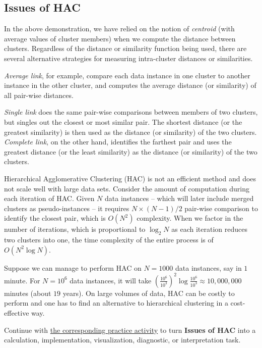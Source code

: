 \documentclass[
  letterpaper,
]{scrbook}
\begin{document}
\subsection{Issues of HAC}\label{issues-of-hac}

In the above demonstration, we have relied on the notion of
\emph{centroid} (with average values of cluster members) when we compute
the distance between clusters. Regardless of the distance or similarity
function being used, there are several alternative strategies for
measuring intra-cluster distances or similarities.

\emph{Average link}, for example, compare each data instance in one
cluster to another instance in the other cluster, and computes the
average distance (or similarity) of all pair-wise distances.

\emph{Single link} does the same pair-wise comparisons between members
of two clusters, but singles out the closest or most similar pair. The
shortest distance (or the greatest similarity) is then used as the
distance (or similarity) of the two clusters. \emph{Complete link}, on
the other hand, identifies the farthest pair and uses the greatest
distance (or the least similarity) as the distance (or similarity) of
the two clusters.

Hierarchical Agglomerative Clustering (HAC) is not an efficient method
and does not scale well with large data sets. Consider the amount of
computation during each iteration of HAC. Given \(N\) data instances --
which will later include merged clusters as pseudo-instances -- it
requires \(N\times(N-1)/2\) pair-wise comparison to identify the closest
pair, which is \(O(N^2)\) complexity. When we factor in the number of
iterations, which is proportional to \(\log_2{N}\) as each iteration
reduces two clusters into one, the time complexity of the entire process
is of \(O(N^2 \log{N})\).

Suppose we can manage to perform HAC on \(N=1000\) data instances, say
in \(1\) minute. For \(N=10^6\) data instances, it will take
\((\frac{10^6}{10^3})^2 \log \frac{10^6}{10^3} \approx 10,000,000\)
minutes (about \(19\) years). On large volumes of data, HAC can be
costly to perform and one has to find an alternative to hierarchical
clustering in a cost-effective way.

\begin{tcolorbox}[enhanced jigsaw, arc=.35mm, bottomrule=.15mm, bottomtitle=1mm, breakable, colback=white, colbacktitle=quarto-callout-tip-color!10!white, colframe=quarto-callout-tip-color-frame, coltitle=black, left=2mm, leftrule=.75mm, opacityback=0, opacitybacktitle=0.6, rightrule=.15mm, title=\textcolor{quarto-callout-tip-color}{\faLightbulb}\hspace{0.5em}{Put it into practice}, titlerule=0mm, toprule=.15mm, toptitle=1mm]

Continue with \hyperref[sec-pr-10-issues-of-hac]{the corresponding
practice activity} to turn \textbf{Issues of HAC} into a calculation,
implementation, visualization, diagnostic, or interpretation task.

\end{tcolorbox}
\end{document}
